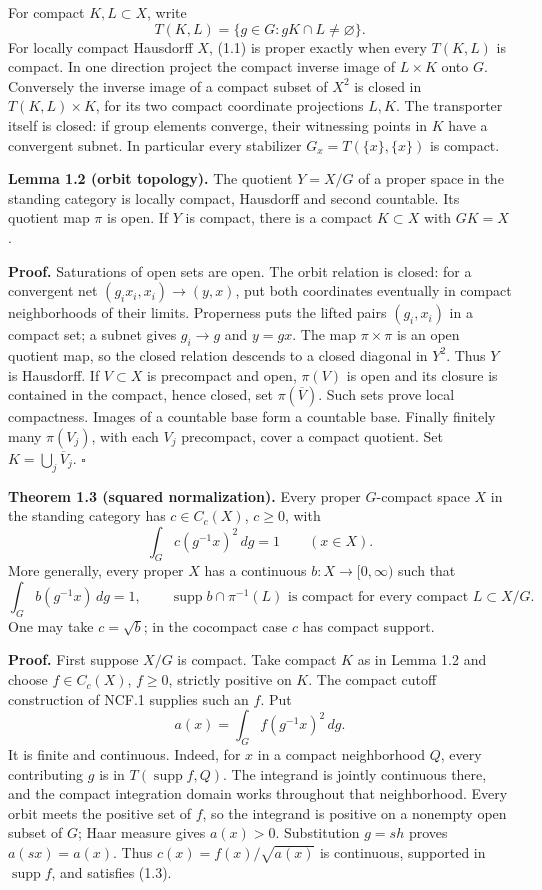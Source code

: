 \documentclass[
  11pt,
]{article}
\begin{document}
For compact \(K,L\subset X\), write \[
 T(K,L)=\{g\in G:gK\cap L\ne\varnothing\}.
 \tag{1.2}
\] For locally compact Hausdorff \(X\), (1.1) is proper exactly when
every \(T(K,L)\) is compact. In one direction project the compact
inverse image of \(L\times K\) onto \(G\). Conversely the inverse image
of a compact subset of \(X^2\) is closed in \(T(K,L)\times K\), for its
two compact coordinate projections \(L,K\). The transporter itself is
closed: if group elements converge, their witnessing points in \(K\)
have a convergent subnet. In particular every stabilizer
\(G_x=T(\{x\},\{x\})\) is compact.

\textbf{Lemma 1.2 (orbit topology).} The quotient \(Y=X/G\) of a proper
space in the standing category is locally compact, Hausdorff and second
countable. Its quotient map \(\pi\) is open. If \(Y\) is compact, there
is a compact \(K\subset X\) with \(GK=X\).

\textbf{Proof.} Saturations of open sets are open. The orbit relation is
closed: for a convergent net \((g_i x_i,x_i)\to(y,x)\), put both
coordinates eventually in compact neighborhoods of their limits.
Properness puts the lifted pairs \((g_i,x_i)\) in a compact set; a
subnet gives \(g_i\to g\) and \(y=gx\). The map \(\pi\times\pi\) is an
open quotient map, so the closed relation descends to a closed diagonal
in \(Y^2\). Thus \(Y\) is Hausdorff. If \(V\subset X\) is precompact and
open, \(\pi(V)\) is open and its closure is contained in the compact,
hence closed, set \(\pi(\overline V)\). Such sets prove local
compactness. Images of a countable base form a countable base. Finally
finitely many \(\pi(V_j)\), with each \(V_j\) precompact, cover a
compact quotient. Set \(K=\bigcup_j\overline V_j\). \(\square\)

\textbf{Theorem 1.3 (squared normalization).} Every proper \(G\)-compact
space \(X\) in the standing category has \(c\in C_c(X)\), \(c\ge0\),
with \[
                 \int_G c(g^{-1}x)^2\,dg=1\qquad(x\in X).
 \tag{1.3}
\] More generally, every proper \(X\) has a continuous
\(b:X\to[0,\infty)\) such that \[
 \int_G b(g^{-1}x)\,dg=1,
 \qquad \operatorname{supp}b\cap\pi^{-1}(L)
       \text{ is compact for every compact }L\subset X/G.
 \tag{1.4}
\] One may take \(c=\sqrt b\); in the cocompact case \(c\) has compact
support.

\textbf{Proof.} First suppose \(X/G\) is compact. Take compact \(K\) as
in Lemma 1.2 and choose \(f\in C_c(X)\), \(f\ge0\), strictly positive on
\(K\). The compact cutoff construction of NCF.1 supplies such an \(f\).
Put \[
 a(x)=\int_G f(g^{-1}x)^2\,dg.
 \tag{1.5}
\] It is finite and continuous. Indeed, for \(x\) in a compact
neighborhood \(Q\), every contributing \(g\) is in
\(T(\operatorname{supp}f,Q)\). The integrand is jointly continuous
there, and the compact integration domain works throughout that
neighborhood. Every orbit meets the positive set of \(f\), so the
integrand is positive on a nonempty open subset of \(G\); Haar measure
gives \(a(x)>0\). Substitution \(g=sh\) proves \(a(sx)=a(x)\). Thus
\(c(x)=f(x)/\sqrt{a(x)}\) is continuous, supported in
\(\operatorname{supp}f\), and satisfies (1.3).
\end{document}
